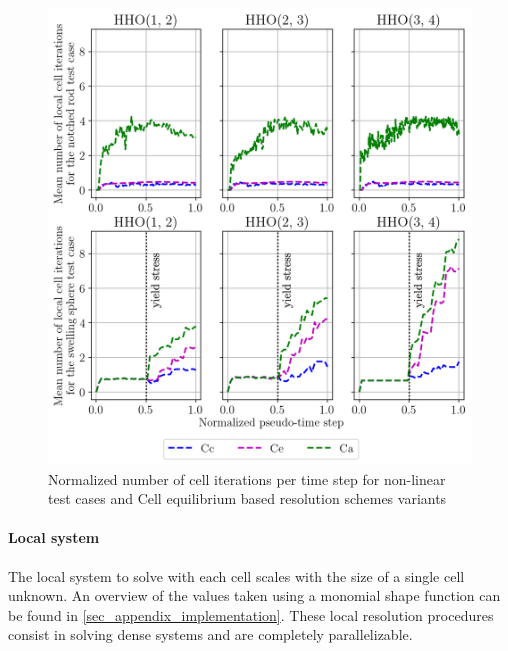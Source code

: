\begin{figure}[H]
    \centering
    \includegraphics[width=12.cm]{../chapter_002_hho_mechanics/figures/plot_cell_iterations__4_cell_iters.png}
    \caption{Normalized number of cell iterations per time step for non-linear test cases and Cell equilibrium based resolution schemes variants}
    \label{fig_acceleration_res_1}
\end{figure}

\paragraph{Local system}

The local system to solve with each cell scales with the size of a single cell unknown. An overview of the values taken using a monomial shape function can be found in \ref{sec_appendix_implementation}. These local resolution procedures consist in solving dense systems and are completely
parallelizable.




